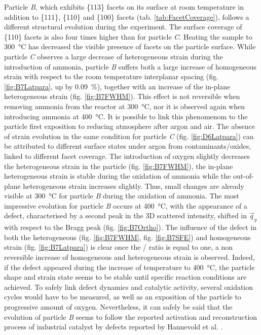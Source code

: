 Particle \textit{B}, which exhibits \{113\} facets on its surface at room temperature in addition to \{111\}, \{110\} and \{100\} facets (tab. \ref{tab:FacetCoverage}), follows a different structural evolution during the experiment.
The surface coverage of \{110\} facets is also four times higher than for particle \textit{C}.
Heating the sample to \qty{300}{\degreeCelsius} has decreased the visible presence of facets on the particle surface.
While particle \textit{C} observes a large decrease of heterogeneous strain during the introduction of ammonia, particle \textit{B} suffers both a large increase of homogeneous strain with respect to the room temperature interplanar spacing (fig. \ref{fig:B7Latpara}, up by \qty{0.09}{\percent}), together with an increase of the in-plane heterogeneous strain (fig. \ref{fig:B7FWHM}).
This effect is not reversible when removing ammonia from the reactor at \qty{300}{\degreeCelsius}, nor it is observed again when introducing ammonia at \qty{400}{\degreeCelsius}.
It is possible to link this phenomenom to the particle first exposition to reducing atmosphere after argon and air.
The absence of strain evolution in the same condition for particle \textit{C} (fig. \ref{fig:D6Latpara}) can be attributed to different surface states under argon from contaminants/oxides, linked to different facet coverage.
The introduction of oxygen slightly decreases the heterogeneous strain in the particle (fig. \ref{fig:B7FWHM}), the in-plane heterogeneous strain is stable during the oxidation of ammonia while the out-of-plane heterogeneous strain increases slightly.
Thus, small changes are already visible at \qty{300}{\degreeCelsius} for particle \textit{B} during the oxidation of ammonia.
The most impressive evolution for particle \textit{B} occurs at \qty{400}{\degreeCelsius}, with the appearance of a defect, characterised by a second peak in the 3D scattered intensity, shifted in $\vec{q}_y$ with respect to the Bragg peak (fig. \ref{fig:B7Ortho}).
The influence of the defect in both the heterogeneous (fig. \ref{fig:B7FWHM}, fig. \ref{fig:B7SFE}) and homogeneous strain (fig. \ref{fig:B7Latpara}) is clear once the / ratio is equal to one, a non reversible increase of homogeneous and heterogeneous strain is observed.
Indeed, if the defect appeared during the increase of temperature to \qty{400}{\degreeCelsius}, the particle shape and strain state seems to be stable until specific reaction conditions are achieved.
To safely link defect dynamics and catalytic activity, several oxidation cycles would have to be measured, as well as an exposition of the particle to progressive amount of oxygen.
Nevertheless, it can safely be said that the evolution of particle \textit{B} seems to follow the reported activation and reconstruction process of industrial catalyst by defects reported by Hannevold et al. \parencite*{Hannevold2005}.

